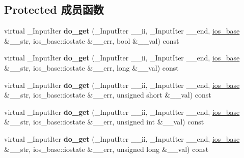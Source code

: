 \subsection*{Protected 成员函数}
\begin{DoxyCompactItemize}
\item 
\mbox{\label{classnum__get_a64af3cf98bc09c5029dfa7c474ddb862}} 
virtual \+\_\+\+Input\+Iter {\bfseries do\+\_\+get} (\+\_\+\+Input\+Iter \+\_\+\+\_\+ii, \+\_\+\+Input\+Iter \+\_\+\+\_\+end, \hyperlink{classios__base}{ios\+\_\+base} \&\+\_\+\+\_\+str, ios\+\_\+base\+::iostate \&\+\_\+\+\_\+err, bool \&\+\_\+\+\_\+val) const
\item 
\mbox{\label{classnum__get_a0a5684d117e04f662f915abd12c6cff5}} 
virtual \+\_\+\+Input\+Iter {\bfseries do\+\_\+get} (\+\_\+\+Input\+Iter \+\_\+\+\_\+ii, \+\_\+\+Input\+Iter \+\_\+\+\_\+end, \hyperlink{classios__base}{ios\+\_\+base} \&\+\_\+\+\_\+str, ios\+\_\+base\+::iostate \&\+\_\+\+\_\+err, long \&\+\_\+\+\_\+val) const
\item 
\mbox{\label{classnum__get_ab7249be1b27ce652f571db40dbb14fa9}} 
virtual \+\_\+\+Input\+Iter {\bfseries do\+\_\+get} (\+\_\+\+Input\+Iter \+\_\+\+\_\+ii, \+\_\+\+Input\+Iter \+\_\+\+\_\+end, \hyperlink{classios__base}{ios\+\_\+base} \&\+\_\+\+\_\+str, ios\+\_\+base\+::iostate \&\+\_\+\+\_\+err, unsigned short \&\+\_\+\+\_\+val) const
\item 
\mbox{\label{classnum__get_a1dab5b3d1830a400e19aa8e15f1f68d8}} 
virtual \+\_\+\+Input\+Iter {\bfseries do\+\_\+get} (\+\_\+\+Input\+Iter \+\_\+\+\_\+ii, \+\_\+\+Input\+Iter \+\_\+\+\_\+end, \hyperlink{classios__base}{ios\+\_\+base} \&\+\_\+\+\_\+str, ios\+\_\+base\+::iostate \&\+\_\+\+\_\+err, unsigned int \&\+\_\+\+\_\+val) const
\item 
\mbox{\label{classnum__get_acb7986e98f58476dc746af4d383d5190}} 
virtual \+\_\+\+Input\+Iter {\bfseries do\+\_\+get} (\+\_\+\+Input\+Iter \+\_\+\+\_\+ii, \+\_\+\+Input\+Iter \+\_\+\+\_\+end, \hyperlink{classios__base}{ios\+\_\+base} \&\+\_\+\+\_\+str, ios\+\_\+base\+::iostate \&\+\_\+\+\_\+err, unsigned long \&\+\_\+\+\_\+val) const
\item 
\mbox{\label{classnum__get_a9a0a16f932369f7040ef09b1162a41ac}} 

\end{DoxyCompactItemize}
